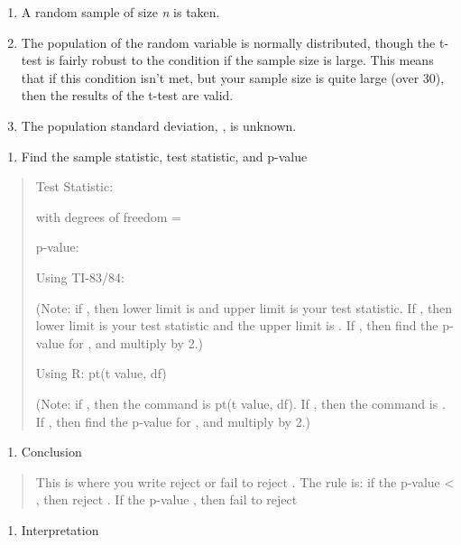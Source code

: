 \documentclass[]{book}
\providecommand{\tightlist}{%
  \setlength{\itemsep}{0pt}\setlength{\parskip}{0pt}}
\begin{document}
\begin{enumerate}
\def\labelenumi{\alph{enumi}.}
\item
  A random sample of size \emph{n} is taken.
\item
  The population of the random variable is normally distributed,
  though the t-test is fairly robust to the condition if the sample
  size is large. This means that if this condition isn't met, but your
  sample size is quite large (over 30), then the results of the t-test
  are valid.
\item
  The population standard deviation, , is unknown.
\end{enumerate}

\begin{enumerate}
\def\labelenumi{\arabic{enumi}.}
\setcounter{enumi}{3}
\tightlist
\item
  Find the sample statistic, test statistic, and p-value
\end{enumerate}

\begin{quote}
Test Statistic:

with degrees of freedom =

p-value:

Using TI-83/84:

(Note: if , then lower limit is and upper limit is your test
statistic. If , then lower limit is your test statistic and the upper
limit is . If , then find the p-value for , and multiply by 2.)

Using R: pt(t value, df)

(Note: if , then the command is pt(t value, df). If , then the command
is . If , then find the p-value for , and multiply by 2.)
\end{quote}

\begin{enumerate}
\def\labelenumi{\arabic{enumi}.}
\setcounter{enumi}{4}
\tightlist
\item
  Conclusion
\end{enumerate}

\begin{quote}
This is where you write reject or fail to reject . The rule is: if the
p-value \textless{} , then reject . If the p-value , then fail to reject
\end{quote}

\begin{enumerate}
\def\labelenumi{\arabic{enumi}.}
\setcounter{enumi}{5}
\tightlist
\item
  Interpretation
\end{enumerate}
\end{document}
